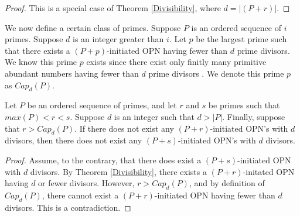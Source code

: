 \documentclass[../paper.tex]{subfiles}
\begin{document}
\begin{proof}
This is a special case of Theorem {\ref{Divisibility}}, where $d = |(P + r)|$.
\end{proof}

We now define a certain class of primes.
Suppose $P$ is an ordered sequence of $i$ primes. Suppose $d$ is
an integer greater than $i$. Let $p$ be the largest prime such 
that there exists a $(P + p)$-initiated OPN having fewer than $d$ 
prime divisors. We know this prime $p$ exists since 
there exist only finitly many primitive abundant numbers having
fewer than $d$ prime divisors \cite{dickson}. We denote this prime $p$
as $Cap_d(P)$. 

\begin{theorem}\label{cap}
Let $P$ be an ordered sequence of primes, and  let $r$ and $s$ be 
primes such that $max(P) < r < s$. Suppose $d$ is an integer such
that $d > |P|$. Finally, suppose that $r > Cap_d(P)$. If there
does not exist any $(P + r)$-initiated OPN's with $d$ divisors,
then there does not exist any $(P + s)$-initiated OPN's with $d$ 
divisors.
\end{theorem}

\begin{proof}
Assume, to the contrary, that there does exist a $(P + 
s)$-initiated OPN with $d$ divisors. By Theorem {\ref{Divisibility}},
there exists a $(P + r)$-initated OPN having $d$ or fewer
divisors. However, $r > Cap_d(P)$, and by definition of
$Cap_d(P)$, there cannot exist a $(P + r)$-initiated OPN having
fewer than $d$ divisors. This is a contradiction.
\end{proof}
\end{document}
